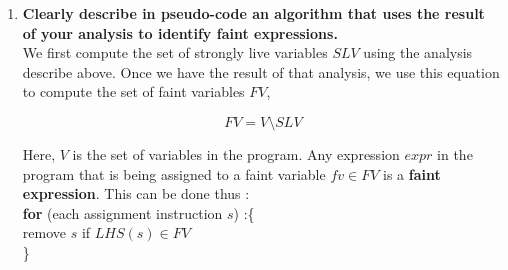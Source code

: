 \begin{enumerate}
\item \textbf{Clearly describe in pseudo-code an algorithm that uses the result of your analysis to identify faint expressions.} \\

  We first compute the set of strongly live variables $SLV$ using the analysis describe above. Once we have the result of that analysis,
  we use this equation to compute the set of faint variables $FV$,

  $$FV = V \setminus SLV$$

  Here, $V$ is the set of variables in the program. Any expression $expr$ in the program that is being
  assigned to a faint variable $fv \in FV$ is a \textbf{faint expression}. This can be done thus :\\
  
  \textbf{for} (each assignment instruction $s$) :\{\\
  remove $s$ if $LHS(s) \in FV$\\  
  \}\\

\end{enumerate}
